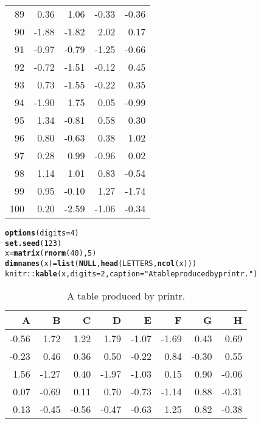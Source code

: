 \documentclass{article}\usepackage[]{graphicx}\usepackage[]{color}
\makeatletter
\newcommand{\hlnum}[1]{\textcolor[rgb]{0.686,0.059,0.569}{#1}}%
\newcommand{\hlstr}[1]{\textcolor[rgb]{0.192,0.494,0.8}{#1}}%
\newcommand{\hlopt}[1]{\textcolor[rgb]{0,0,0}{#1}}%
\newcommand{\hlstd}[1]{\textcolor[rgb]{0.345,0.345,0.345}{#1}}%
\newcommand{\hlkwa}[1]{\textcolor[rgb]{0.161,0.373,0.58}{\textbf{#1}}}%
\newcommand{\hlkwb}[1]{\textcolor[rgb]{0.69,0.353,0.396}{#1}}%
\newcommand{\hlkwc}[1]{\textcolor[rgb]{0.333,0.667,0.333}{#1}}%
\newcommand{\hlkwd}[1]{\textcolor[rgb]{0.737,0.353,0.396}{\textbf{#1}}}%
\newenvironment{kframe}{%
 \def\at@end@of@kframe{}%
 \ifinner\ifhmode%
  \def\at@end@of@kframe{\end{minipage}}%
  \begin{minipage}{\columnwidth}%
 \fi\fi%
 \def\FrameCommand##1{\hskip\@totalleftmargin \hskip-\fboxsep
 \colorbox{shadecolor}{##1}\hskip-\fboxsep
     \hskip-\linewidth \hskip-\@totalleftmargin \hskip\columnwidth}%
 \MakeFramed {\advance\hsize-\width
   \@totalleftmargin\z@ \linewidth\hsize
   \@setminipage}}%
 {\par\unskip\endMakeFramed%
 \at@end@of@kframe}
\makeatother
\begin{document}
\begin{longtable}{rrrrr}
  89 & 0.36 & 1.06 & -0.33 & -0.36 \\ 
  90 & -1.88 & -1.82 & 2.02 & 0.17 \\ 
  91 & -0.97 & -0.79 & -1.25 & -0.66 \\ 
  92 & -0.72 & -1.51 & -0.12 & 0.45 \\ 
  93 & 0.73 & -1.55 & -0.22 & 0.35 \\ 
  94 & -1.90 & 1.75 & 0.05 & -0.99 \\ 
  95 & 1.34 & -0.81 & 0.58 & 0.30 \\ 
  96 & 0.80 & -0.63 & 0.38 & 1.02 \\ 
  97 & 0.28 & 0.99 & -0.96 & 0.02 \\ 
  98 & 1.14 & 1.01 & 0.83 & -0.54 \\ 
  99 & 0.95 & -0.10 & 1.27 & -1.74 \\ 
  100 & 0.20 & -2.59 & -1.06 & -0.34 \\ 
   \hline
\hline
\end{longtable}





\begin{kframe}
\begin{alltt}
\hlkwd{options}\hlstd{(}\hlkwc{digits} \hlstd{=} \hlnum{4}\hlstd{)}
\hlkwd{set.seed}\hlstd{(}\hlnum{123}\hlstd{)}
\hlstd{x} \hlkwb{=} \hlkwd{matrix}\hlstd{(}\hlkwd{rnorm}\hlstd{(}\hlnum{40}\hlstd{),} \hlnum{5}\hlstd{)}
\hlkwd{dimnames}\hlstd{(x)} \hlkwb{=} \hlkwd{list}\hlstd{(}\hlkwa{NULL}\hlstd{,} \hlkwd{head}\hlstd{(LETTERS,} \hlkwd{ncol}\hlstd{(x)))}
\hlstd{knitr}\hlopt{::}\hlkwd{kable}\hlstd{(x,} \hlkwc{digits} \hlstd{=} \hlnum{2}\hlstd{,} \hlkwc{caption} \hlstd{=} \hlstr{"A table produced by printr."}\hlstd{)}
\end{alltt}
\end{kframe}\begin{table}

\caption{\label{tab:unnamed-chunk-2}A table produced by printr.}
\centering
\begin{tabular}[t]{r|r|r|r|r|r|r|r}
\hline
A & B & C & D & E & F & G & H\\
\hline
-0.56 & 1.72 & 1.22 & 1.79 & -1.07 & -1.69 & 0.43 & 0.69\\
\hline
-0.23 & 0.46 & 0.36 & 0.50 & -0.22 & 0.84 & -0.30 & 0.55\\
\hline
1.56 & -1.27 & 0.40 & -1.97 & -1.03 & 0.15 & 0.90 & -0.06\\
\hline
0.07 & -0.69 & 0.11 & 0.70 & -0.73 & -1.14 & 0.88 & -0.31\\
\hline
0.13 & -0.45 & -0.56 & -0.47 & -0.63 & 1.25 & 0.82 & -0.38\\
\hline
\end{tabular}
\end{table}
\end{document}
